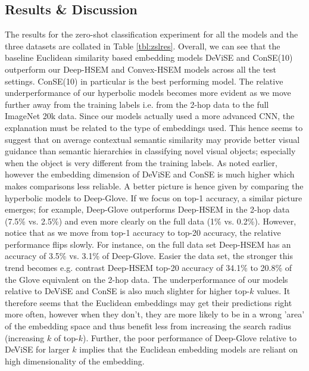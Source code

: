\documentclass[12pt]{report}
\begin{document}
\subsection{Results \& Discussion}
The results for the zero-shot classification experiment for all the models and the three datasets are collated in Table \ref{tbl:zslres}. Overall, we can see that the baseline Euclidean similarity based embedding models DeViSE and ConSE(10) outperform our Deep-HSEM and Convex-HSEM models across all the test settings. ConSE(10) in particular is the best performing model. The relative underperformance of our hyperbolic models becomes more evident as we move further away from the training labels i.e. from the 2-hop data to the full ImageNet 20k data. Since our models actually used a more advanced CNN, the explanation must be related to the type of embeddings used. This hence seems to suggest that on average contextual semantic similarity may provide better visual guidance than semantic hierarchies in classifying novel visual objects; especially when the object is very different from the training labels. As noted earlier, however the embedding dimension of DeViSE and ConSE is much higher which makes comparisons less reliable. A better picture is hence given by comparing the hyperbolic models to Deep-Glove. If we focus on top-1 accuracy, a similar picture emerges; for example, Deep-Glove outperforms Deep-HSEM in the 2-hop data (7.5\% vs. 2.5\%) and even more clearly on the full data (1\% vs. 0.2\%). However, notice that as we move from top-1 accuracy to top-20 accuracy, the relative performance flips slowly. For instance, on the full data set Deep-HSEM has an accuracy of 3.5\% vs. 3.1\% of Deep-Glove. Easier the data set, the stronger this trend becomes e.g. contrast Deep-HSEM top-20 accuracy of 34.1\% to 20.8\% of the Glove equivalent on the 2-hop data. The underperformance of our models relative to DeViSE and ConSE is also much slighter for higher top-$k$ values. It therefore seems that the Euclidean embeddings may get their predictions right more often, however when they don't, they are more likely to be in a wrong 'area' of the embedding space and thus benefit less from increasing the search radius (increasing $k$ of top-$k$). Further, the poor performance of Deep-Glove relative to DeViSE for larger $k$ implies that the Euclidean embedding models are reliant on high dimensionality of the embedding.
\end{document}
